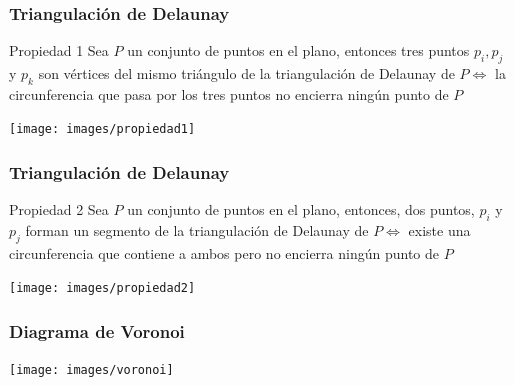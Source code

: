 \begin{frame}
  \frametitle{Triangulación de Delaunay}
  \begin{beamerboxesrounded}[shadow=true]{Propiedad 1}
    Sea $P$ un conjunto de puntos en el plano, entonces tres puntos $p_i, p_j$ y
    $p_k$ son vértices del mismo triángulo de la triangulación de Delaunay de $P
    \Leftrightarrow$ la circunferencia que pasa por los tres puntos no encierra
    ningún punto de $P$
  \end{beamerboxesrounded}
  \begin{center}
  \texttt{[image: images/propiedad1]}
  \end{center}
\end{frame}
\begin{frame}
  \frametitle{Triangulación de Delaunay}
  \begin{beamerboxesrounded}[shadow=true]{Propiedad 2}
    Sea $P$ un conjunto de puntos en el plano, entonces, dos puntos, $p_i$ y
    $p_j$ forman un segmento de la triangulación de Delaunay de $P
    \Leftrightarrow$ existe una circunferencia que contiene a ambos pero no
    encierra ningún punto de $P$
  \end{beamerboxesrounded}
  \begin{center}
  \texttt{[image: images/propiedad2]}
  \end{center}
\end{frame}
\begin{frame}
  \frametitle{Diagrama de Voronoi}
  \begin{center}
  \texttt{[image: images/voronoi]}
  \end{center}
\end{frame}
